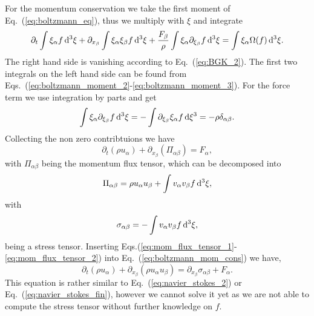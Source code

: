 For the momentum conservation we take the first moment of Eq.~(\ref{eq:boltzmann_eq}), thus we multiply with $\xi$ and integrate
\begin{equation}
    \partial_t\int\xi_{\alpha}f\mathop{}\!\mathrm{d}^3\xi + \partial_{x_{\beta}}\int\xi_{\alpha}\xi_{\beta} f\mathop{}\!\mathrm{d}^3\xi + \frac{F_{\beta}}{\rho}\int\xi_{\alpha}\partial_{\xi_{\beta}}f\mathop{}\!\mathrm{d}^3\xi = \int\xi_{\alpha}\Omega(f)\mathop{}\!\mathrm{d}^3\xi.
\end{equation}
The right hand side is vanishing according to Eq.~(\ref{eq:BGK_2}). 
The first two integrals on the left hand side can be found from Eqs.~(\ref{eq:boltzmann_moment_2}-\ref{eq:boltzmann_moment_3}).
For the force term we use integration by parts and get
\begin{equation}
    \int\xi_{\alpha}\partial_{\xi_{\beta}}f\mathop{}\!\mathrm{d}^3\xi = -\int\partial_{\xi_{\beta}}\xi_{\alpha} f\mathop{}\!\mathrm{d}\xi^3 = -\rho\delta_{\alpha\beta}.
\end{equation}
Collecting the non zero contribtuions we have
\begin{equation}\label{eq:boltzmann_mom_cons}
    \partial_t (\rho u_{\alpha}) + \partial_{x_{\beta}}(\Pi_{\alpha\beta}) = F_{\alpha}, 
\end{equation}
with $\Pi_{\alpha\beta}$ being the momentum flux tensor, which can be decomposed into
\begin{equation}\label{eq:mom_flux_tensor_1}
    \Pi_{\alpha\beta} = \rho u_{\alpha}u_{\beta} +\int v_{\alpha}v_{\beta}f\mathop{}\!\mathrm{d}^3\xi,
\end{equation}
with 
\begin{equation}\label{eq:mom_flux_tensor_2}
    \sigma_{\alpha\beta} = -\int v_{\alpha}v_{\beta}f\mathop{}\!\mathrm{d}^3\xi,
\end{equation}
being a stress tensor.
Inserting Eqs.(\ref{eq:mom_flux_tensor_1}-\ref{eq:mom_flux_tensor_2}) into Eq.~(\ref{eq:boltzmann_mom_cons}) we have,
\begin{equation}\label{eq:mom_boltzmann}
    \partial_t (\rho u_{\alpha}) + \partial_{x_{\beta}}(\rho u_{\alpha}u_{\beta}) = \partial_{x_{\beta}}\sigma_{\alpha\beta} + F_{\alpha}.
\end{equation}
This equation is rather similar to Eq.~(\ref{eq:navier_stokes_2}) or Eq.~(\ref{eq:navier_stokes_fin}), however we cannot solve it yet as we are not able to compute the stress tensor without further knowledge on $f$.

